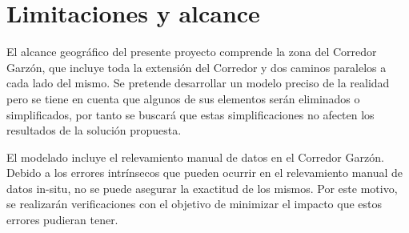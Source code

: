 %
%
%

\section{Limitaciones y alcance}

El alcance geográfico del presente proyecto comprende la zona del Corredor Garzón, que incluye toda la extensión del Corredor y dos caminos paralelos a cada lado del mismo. Se pretende desarrollar un modelo preciso de la realidad pero se tiene en cuenta que algunos de sus elementos serán eliminados o simplificados, por tanto se buscará que estas simplificaciones no afecten los resultados de la solución propuesta. 

El modelado incluye el relevamiento manual de datos en el Corredor Garzón. Debido a los errores intrínsecos que pueden ocurrir en el relevamiento manual de datos in-situ, no se puede asegurar la exactitud de los mismos. Por este motivo, se realizarán verificaciones con el objetivo de minimizar el impacto que estos errores pudieran tener.

